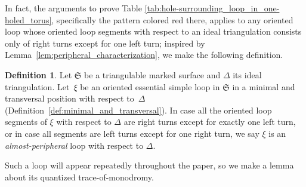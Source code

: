\documentclass[10pt,a4paper]{amsart}
\numberwithin{equation}{section}
\theoremstyle{definition}
\newtheorem{Definition}[Theorem]{Definition}
\begin{document}
In fact, the arguments to prove Table \ref{tab:hole-surrounding_loop_in_one-holed_torus}, specifically the pattern colored red there, applies to any oriented loop whose oriented loop segments with respect to an ideal triangulation consists only of right turns except for one left turn; inspired by Lemma~\ref{lem:peripheral_characterization}, we make the following definition.
\begin{Definition}
\label{def:AP}
Let $\mathfrak{S}$ be a triangulable marked surface and $\Delta$ its ideal triangulation. Let~$\xi$ be an oriented essential simple loop in $\mathfrak{S}$ in a minimal and transversal position with respect to~$\Delta$ (Definition~\ref{def:minimal_and_transversal}).
In case all the oriented loop segments of $\xi$ with respect to $\Delta$ are right turns except for exactly one left turn, or in case all segments are left turns except for one right turn, we say $\xi$ is an {\em almost-peripheral} loop with respect to $\Delta$.
\end{Definition}
Such a loop will appear repeatedly throughout the paper, so we make a lemma about its quantized trace-of-monodromy.
\end{document}
